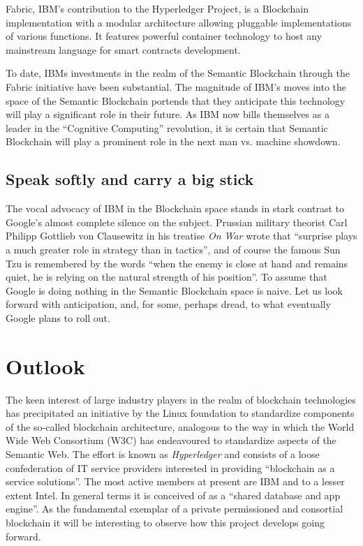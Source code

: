 Fabric, IBM's contribution to the Hyperledger Project, is a Blockchain implementation with a modular architecture allowing pluggable implementations of various functions. It features powerful container technology to host any mainstream language for smart contracts development.

To date, IBMs investments in the realm of the Semantic Blockchain through the Fabric initiative have been substantial. The magnitude of IBM's moves into the space of the Semantic Blockchain portends that they anticipate this technology will play a significant role in their future. As IBM now bills themselves as a leader in the ``Cognitive Computing'' revolution, it is certain that Semantic Blockchain will play a prominent role in the next man vs. machine showdown.

\subsection*{Speak softly and carry a big stick}

The vocal advocacy of IBM in the Blockchain space stands in stark contrast to Google's almost complete silence on the subject. Prussian military theorist Carl Philipp Gottlieb von Clausewitz in his treatise \textit{On War} wrote that ``surprise plays a much greater role in strategy than in tactics'', and of course the famous Sun Tzu is remembered by the words ``when the enemy is close at hand and remains quiet, he is relying on the natural strength of his position''. 
To assume that Google is doing nothing in the Semantic Blockchain space is naive. 
Let us look forward with anticipation, and, for some, perhaps dread, to what eventually Google plans to roll out.

\section{Outlook\label{sec:outlook}}

The keen interest of large industry players in the realm of blockchain technologies has precipitated an initiative by the Linux foundation to standardize components of the so-called blockchain architecture, analogous to the way in which the World Wide Web Consortium (W3C) has endeavoured to standardize aspects of the Semantic Web. 
The effort is known as \textit{Hyperledger} and consists of a loose confederation of IT service providers interested in providing ``blockchain as a service solutions''. 
The most active members at present are IBM and to a lesser extent Intel. 
In general terms it is conceived of as a ``shared database and app engine''. 
As the fundamental exemplar of a private permissioned and consortial blockchain it will be interesting to observe how this project develops going forward. 

